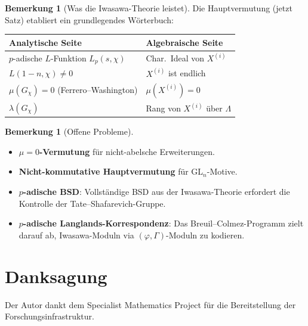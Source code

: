 \documentclass[12pt,a4paper]{amsart}
\theoremstyle{definition}
\newtheorem{remark}[theorem]{Bemerkung}
\begin{document}
\begin{remark}[Was die Iwasawa-Theorie leistet]
Die Hauptvermutung (jetzt Satz) etabliert ein grundlegendes Wörterbuch:
\begin{center}
\begin{tabular}{l|l}
\textbf{Analytische Seite} & \textbf{Algebraische Seite} \\
\hline
$p$-adische $L$-Funktion $L_p(s, \chi)$ & Char.\ Ideal von $X^{(i)}$ \\
$L(1-n, \chi) \ne 0$ & $X^{(i)}$ ist endlich \\
$\mu(G_\chi) = 0$ (Ferrero--Washington) & $\mu(X^{(i)}) = 0$ \\
$\lambda(G_\chi)$ & Rang von $X^{(i)}$ über $\Lambda$ \\
\end{tabular}
\end{center}
\end{remark}

\begin{remark}[Offene Probleme]
\begin{itemize}
  \item \textbf{$\mu = 0$-Vermutung} für nicht-abelsche Erweiterungen.
  \item \textbf{Nicht-kommutative Hauptvermutung} für GL$_n$-Motive.
  \item \textbf{$p$-adische BSD}: Vollständige BSD aus der Iwasawa-Theorie
    erfordert die Kontrolle der Tate--Shafarevich-Gruppe.
  \item \textbf{$p$-adische Langlands-Korrespondenz}: Das Breuil--Colmez-Programm
    zielt darauf ab, Iwasawa-Moduln via $(\varphi,\Gamma)$-Moduln zu kodieren.
\end{itemize}
\end{remark}

\section*{Danksagung}
Der Autor dankt dem Specialist Mathematics Project für die Bereitstellung
der Forschungsinfrastruktur.
\end{document}

